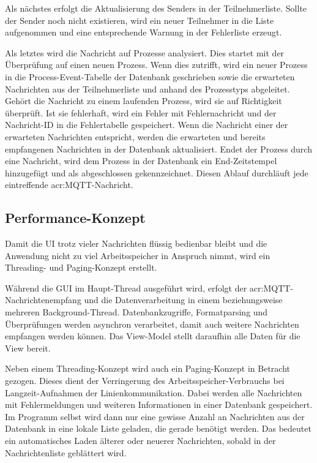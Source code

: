 Als nächstes erfolgt die Aktualisierung des Senders in der Teilnehmerliste. Sollte der Sender noch nicht existieren, wird ein neuer Teilnehmer in die Liste aufgenommen und eine entsprechende Warnung in der Fehlerliste erzeugt.

Als letztes wird die Nachricht auf Prozesse analysiert. Dies startet mit der Überprüfung auf einen neuen Prozess. Wenn dies zutrifft, wird ein neuer Prozess in die Process-Event-Tabelle der Datenbank geschrieben sowie die erwarteten Nachrichten aus der Teilnehmerliste und anhand des Prozesstyps abgeleitet. 
Gehört die Nachricht zu einem laufenden Prozess, wird sie auf Richtigkeit überprüft. Ist sie fehlerhaft, wird ein Fehler mit Fehlernachricht und der Nachricht-ID in die Fehlertabelle gespeichert. Wenn die Nachricht einer der erwarteten Nachrichten entspricht, werden die erwarteten und bereits empfangenen Nachrichten in der Datenbank aktualisiert.
 Endet der Prozess durch eine Nachricht, wird dem Prozess in der Datenbank ein End-Zeitstempel hinzugefügt und als abgeschlossen gekennzeichnet. Diesen Ablauf durchläuft jede eintreffende \acrshort{acr:MQTT}-Nachricht.

\subsection{Performance-Konzept}
Damit die UI trotz vieler Nachrichten flüssig bedienbar bleibt und die Anwendung nicht zu viel Arbeitsspeicher in Anspruch nimmt, wird ein Threading- und Paging-Konzept erstellt. 

Während die GUI im Haupt-Thread ausgeführt wird, erfolgt der \acrshort{acr:MQTT}-Nachrichtenempfang und die Datenverarbeitung in einem beziehungsweise mehreren Background-Thread. Datenbankzugriffe, Formatparsing und Überprüfungen werden asynchron verarbeitet, damit auch weitere Nachrichten empfangen werden können. Das View-Model stellt daraufhin alle Daten für die View bereit. 

Neben einem Threading-Konzept wird auch ein Paging-Konzept in Betracht gezogen. Dieses dient der Verringerung des Arbeitsspeicher-Verbrauchs bei Langzeit-Aufnahmen der Linienkommunikation. Dabei werden alle Nachrichten mit Fehlermeldungen und weiteren Informationen in einer Datenbank gespeichert. Im Programm selbst wird dann nur eine gewisse Anzahl an Nachrichten aus der Datenbank in eine lokale Liste geladen, die gerade benötigt werden. Das bedeutet ein automatisches Laden älterer oder neuerer Nachrichten, sobald in der Nachrichtenliste geblättert wird. \autocite{tiwariVirtualMemoryExplained2025}

